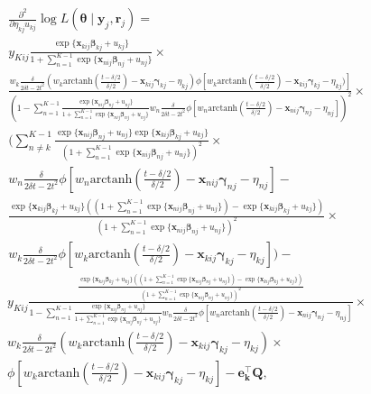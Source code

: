 \documentclass[12pt, %
               openright, %
               oneside, %
               a4paper, %
               chapter=TITLE, %
               section=TITLE, %
               brazil,
               english %
]{abntex2}
\begin{document}
\begin{apendicesenv}
\begin{align*}
  &\frac{\partial^{2}}{\partial \eta_{kj} u_{kj}}
    \log L(\bm{\theta}\mid\bm{y}_{j}, \bm{r}_{j}) =\\
  &y_{Kij}
    \frac{\exp\{\bm{x}_{kij}\bm{\beta}_{kj} + u_{kj}\}}{1 +
    \sum_{n = 1}^{K-1}\exp\{\bm{x}_{nij}\bm{\beta}_{nj} + u_{nj}\}}\times\\
  &\frac{
    w_{k}\frac{\delta}{2\delta t - 2t^{2}}
    (w_{k}\text{arctanh}\left(\frac{t-\delta/2}{\delta/2}\right)
    - \bm{x}_{kij}\bm{\gamma}_{kj} - \eta_{kj})
    \phi[w_{k}\text{arctanh}\left(\frac{t-\delta/2}{\delta/2}\right)
    - \bm{x}_{kij}\bm{\gamma}_{kj} - \eta_{kj})]}{
    \left(1 -
    \sum_{n = 1}^{K-1}\frac{\exp\{\bm{x}_{nij}\bm{\beta}_{nj} + u_{nj}\}}{
    1 +
    \sum_{n = 1}^{K-1}\exp\{\bm{x}_{nij}\bm{\beta}_{nj} + u_{nj}\}}
    w_{n}\frac{\delta}{2\delta t - 2t^{2}}
    \phi[w_{n}\text{arctanh}\left(\frac{t-\delta/2}{\delta/2}\right)
    - \bm{x}_{nij}\bm{\gamma}_{nj} - \eta_{nj}]\right)^{2}}\times\\
  &\Bigg(
    \sum_{n \neq k}^{K-1}
    \frac{
    \exp\{\bm{x}_{nij}\bm{\beta}_{nj} + u_{nj}\}
    \exp\{\bm{x}_{kij}\bm{\beta}_{kj} + u_{kj}\}}{
    \left(1 +
    \sum_{n = 1}^{K-1}\exp\{\bm{x}_{nij}\bm{\beta}_{nj} + u_{nj}\}
    \right)^{2}}\times\\
  &w_{n}\frac{\delta}{2\delta t - 2t^{2}}
    \phi[w_{n}\text{arctanh}\left(\frac{t-\delta/2}{\delta/2}\right)
    - \bm{x}_{nij}\bm{\gamma}_{nj} - \eta_{nj}] -\\
  &\frac{\exp\{\bm{x}_{kij}\bm{\beta}_{kj} + u_{kj}\}
    \left(
    \left(1 +
    \sum_{n = 1}^{K-1}\exp\{\bm{x}_{nij}\bm{\beta}_{nj} + u_{nj}\}
    \right) - \exp\{\bm{x}_{kij} \bm{\beta}_{kj} + u_{kj}\}
    \right)}{
    \left(1 +
    \sum_{n = 1}^{K-1}\exp\{\bm{x}_{nij}\bm{\beta}_{nj} + u_{nj}\}
    \right)^{2}}\times\\
  &w_{k}\frac{\delta}{2\delta t - 2t^{2}}
    \phi[w_{k}\text{arctanh}\left(\frac{t-\delta/2}{\delta/2}\right)
    - \bm{x}_{kij}\bm{\gamma}_{kj} - \eta_{kj}]\Bigg) -
\end{align*}
\begin{align*}
  &y_{Kij}
    \frac{
    \frac{\exp\{\bm{x}_{kij}\bm{\beta}_{kj} + u_{kj}\}
    \left(
    \left(1 +
    \sum_{n = 1}^{K-1}\exp\{\bm{x}_{nij}\bm{\beta}_{nj} + u_{nj}\}
    \right) - \exp\{\bm{x}_{kij} \bm{\beta}_{kj} + u_{kj}\}
    \right)}{
    \left(1 +
    \sum_{n = 1}^{K-1}\exp\{\bm{x}_{nij}\bm{\beta}_{nj} + u_{nj}\}
    \right)^{2}}}{1 -
    \sum_{n = 1}^{K-1}\frac{\exp\{\bm{x}_{nij}\bm{\beta}_{nj} + u_{nj}\}}{
    1 + \sum_{n = 1}^{K-1}\exp\{\bm{x}_{nij}\bm{\beta}_{nj} + u_{nj}\}}
    w_{n}\frac{\delta}{2\delta t - 2t^{2}}
    \phi[w_{n}\text{arctanh}\left(\frac{t-\delta/2}{\delta/2}\right)
    - \bm{x}_{nij}\bm{\gamma}_{nj} - \eta_{nj}]}\times\\
  &w_{k}\frac{\delta}{2\delta t - 2t^{2}}
    (w_{k}\text{arctanh}\left(\frac{t-\delta/2}{\delta/2}\right)
    - \bm{x}_{kij}\bm{\gamma}_{kj} - \eta_{kj})\times\\
  &\phi[w_{k}\text{arctanh}\left(\frac{t-\delta/2}{\delta/2}\right)
    - \bm{x}_{kij}\bm{\gamma}_{kj} - \eta_{kj}] - \bm{e_{k}^{\top}Q},
\end{align*}


\end{apendicesenv}
\end{document}
